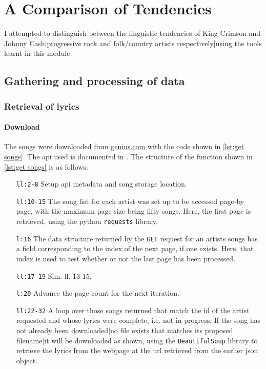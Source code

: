\section{A Comparison of Tendencies}

I attempted to distinguish between the linguistic tendencies of King Crimson and Johnny Cash|progressive rock and folk/country artists respectively|using the tools learnt in this module.

\subsection{Gathering and processing of data}
\subsubsection{Retrieval of lyrics}

\paragraph{Download}

The songs were downloaded from \href{https://genius.com/}{genius.com} with the code shown in \cref{lst:get songs}. The api used is documented in \cite{geniusapi}. The structure of the function shown in \cref{lst:get songs} is as follows:
\begin{itemize}
	\item[\texttt{ll:2-8}] Setup api metadata and song storage location.
	\item[\texttt{ll:10-15}] The song list for each artist was set up to be accessed page-by page, with the maximum page size being fifty songs. Here, the first page is retrieved, using the python \texttt{requests} library.
	\item[\texttt{l:16}] The data structure returned by the \texttt{GET} request for an artists songs has a field corresponding to the index of the next page, if one exists. Here, that index is used to test whether or not the last page has been processed.
	\item[\texttt{ll:17-19}] Sim. ll. 13-15.
	\item[\texttt{l:20}] Advance the page count for the next iteration.
	\item[\texttt{ll:22-32}] A loop over those songs returned that match the id of the artist requested and whose lyrics were complete, i.e. not in progress. If the song has not already been downloaded|no file exists that matches its proposed filename|it will be downloaded as shown, using the \texttt{BeautifulSoup} library \cite{beautifulsoup} to retrieve the lyrics from the webpage at the url retrieved from the earlier json object.
\end{itemize}

